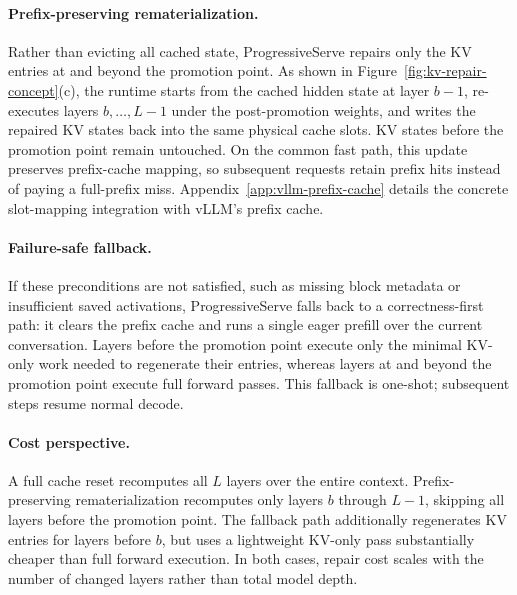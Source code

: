 \documentclass[sigplan,anonymous,review,nonacm]{acmart}
\begin{document}
\paragraph{Prefix-preserving rematerialization.}
Rather than evicting all cached state, ProgressiveServe repairs only the KV entries at and beyond the promotion point. As shown in Figure~\ref{fig:kv-repair-concept}(c), the runtime starts from the cached hidden state at layer $b{-}1$, re-executes layers $b, \ldots, L{-}1$ under the post-promotion weights, and writes the repaired KV states back into the same physical cache slots. KV states before the promotion point remain untouched. On the common fast path, this update preserves prefix-cache mapping, so subsequent requests retain prefix hits instead of paying a full-prefix miss. Appendix~\ref{app:vllm-prefix-cache} details the concrete slot-mapping integration with vLLM's prefix cache.

\paragraph{Failure-safe fallback.}
If these preconditions are not satisfied, such as missing block metadata or insufficient saved activations, ProgressiveServe falls back to a correctness-first path: it clears the prefix cache and runs a single eager prefill over the current conversation. Layers before the promotion point execute only the minimal KV-only work needed to regenerate their entries, whereas layers at and beyond the promotion point execute full forward passes. This fallback is one-shot; subsequent steps resume normal decode.

\paragraph{Cost perspective.}
A full cache reset recomputes all $L$ layers over the entire context. Prefix-preserving rematerialization recomputes only layers $b$ through $L{-}1$, skipping all layers before the promotion point. The fallback path additionally regenerates KV entries for layers before $b$, but uses a lightweight KV-only pass substantially cheaper than full forward execution. In both cases, repair cost scales with the number of changed layers rather than total model depth.


\end{document}
